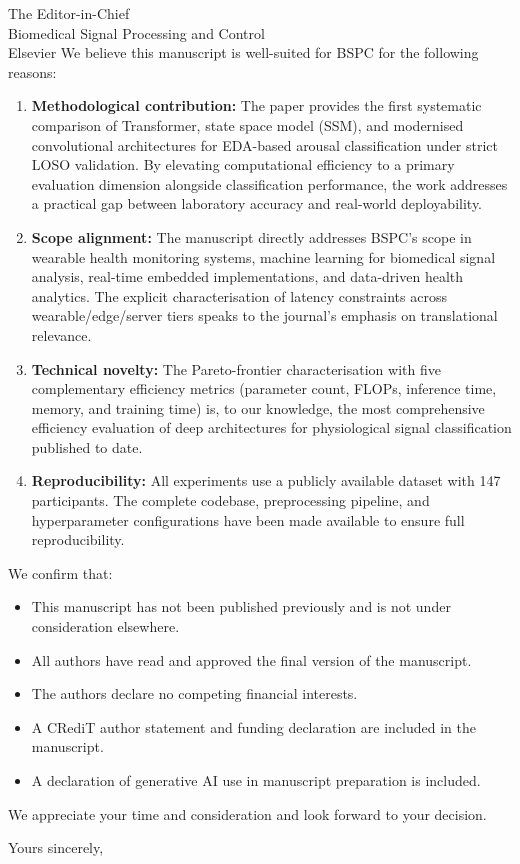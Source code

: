 \documentclass[12pt]{letter}
\begin{document}
\begin{letter}{The Editor-in-Chief\\
Biomedical Signal Processing and Control\\
Elsevier}
We believe this manuscript is well-suited for BSPC for the following reasons:
\begin{enumerate}
  \item \textbf{Methodological contribution:} The paper provides the first systematic comparison of Transformer, state space model (SSM), and modernised convolutional architectures for EDA-based arousal classification under strict LOSO validation. By elevating computational efficiency to a primary evaluation dimension alongside classification performance, the work addresses a practical gap between laboratory accuracy and real-world deployability.
  \item \textbf{Scope alignment:} The manuscript directly addresses BSPC's scope in wearable health monitoring systems, machine learning for biomedical signal analysis, real-time embedded implementations, and data-driven health analytics. The explicit characterisation of latency constraints across wearable/edge/server tiers speaks to the journal's emphasis on translational relevance.
  \item \textbf{Technical novelty:} The Pareto-frontier characterisation with five complementary efficiency metrics (parameter count, FLOPs, inference time, memory, and training time) is, to our knowledge, the most comprehensive efficiency evaluation of deep architectures for physiological signal classification published to date.
  \item \textbf{Reproducibility:} All experiments use a publicly available dataset with 147 participants. The complete codebase, preprocessing pipeline, and hyperparameter configurations have been made available to ensure full reproducibility.
\end{enumerate}

We confirm that:
\begin{itemize}
  \item This manuscript has not been published previously and is not under consideration elsewhere.
  \item All authors have read and approved the final version of the manuscript.
  \item The authors declare no competing financial interests.
  \item A CRediT author statement and funding declaration are included in the manuscript.
  \item A declaration of generative AI use in manuscript preparation is included.
\end{itemize}

We appreciate your time and consideration and look forward to your decision.

\closing{Yours sincerely,}

\end{letter}
\end{document}
